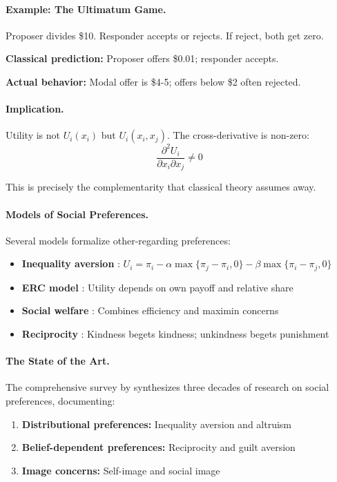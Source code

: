 \paragraph{Example: The Ultimatum Game.}
Proposer divides \$10. Responder accepts or rejects. If reject, both get zero.

\textbf{Classical prediction:} Proposer offers \$0.01; responder accepts.

\textbf{Actual behavior:} Modal offer is \$4-5; offers below \$2 often rejected.

\paragraph{Implication.}
Utility is not $U_i(x_i)$ but $U_i(x_i, x_j)$.
The cross-derivative is non-zero:
\begin{equation}
  \frac{\partial^2 U_i}{\partial x_i \partial x_j} \neq 0
\end{equation}

This is precisely the complementarity that classical theory assumes away.

\paragraph{Models of Social Preferences.}
Several models formalize other-regarding preferences:
\begin{itemize}
  \item \textbf{Inequality aversion} \citep{fehrschmidt1999}: 
        $U_i = \pi_i - \alpha \max\{\pi_j - \pi_i, 0\} - \beta \max\{\pi_i - \pi_j, 0\}$
  \item \textbf{ERC model} \citep{boltonockenfels2000}: Utility depends on own payoff and relative share
  \item \textbf{Social welfare} \citep{charnessrabin2002}: Combines efficiency and maximin concerns
  \item \textbf{Reciprocity} \citep{rabin1993}: Kindness begets kindness; unkindness begets punishment
\end{itemize}

\paragraph{The State of the Art.}
The comprehensive survey by \citet{fehrcharness2024} synthesizes three decades of
research on social preferences, documenting:
\begin{enumerate}
  \item \textbf{Distributional preferences:} Inequality aversion and altruism
  \item \textbf{Belief-dependent preferences:} Reciprocity and guilt aversion \citep{charnessdufwenberg2006}
  \item \textbf{Image concerns:} Self-image and social image \citep{benaboutirole2006}
\end{enumerate}

